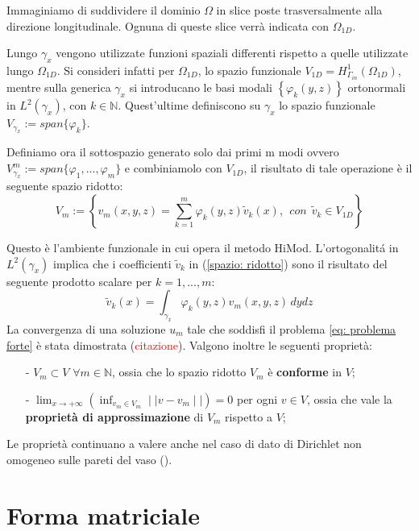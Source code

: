 Immaginiamo di suddividere il dominio $\Omega$ in slice poste trasversalmente alla direzione longitudinale. Ognuna di queste slice verr\`a indicata con $\Omega_{1D}$.

Lungo $\gamma_x$ vengono utilizzate funzioni spaziali differenti rispetto a quelle utilizzate lungo $\Omega_{1D}$. Si consideri infatti per $\Omega_{1D}$, lo spazio funzionale $V_{1D}=H^1_{\Gamma_{in}}(\Omega_{1D})$, mentre sulla generica $\gamma_x$ si introducano le basi modali $\left\{ \varphi_k(y,z) \right\}$ ortonormali in $L^2(\gamma_x)$, con $k \in \mathbb{N}$.
Quest'ultime definiscono su $\gamma_x$ lo spazio funzionale $V_{\gamma_x}:=span\{\varphi_k\}$.

Definiamo ora il sottospazio generato solo dai primi m modi ovvero  $V^m_{\gamma_x}:=span\{\varphi_1,...,\varphi_m\}$ e combiniamolo con $V_{1D}$, il risultato di tale operazione \`e il seguente spazio ridotto:
\begin{equation}
\label{spazio: ridotto}
V_m:=\left\{v_m(x,y,z)=\sum^m_{k=1}\varphi_k(y,z)\tilde{v}_k(x) ,\:\:con\:\:\tilde{v}_k\in V_{1D}\right\}
\end{equation}

Questo \`e l'ambiente funzionale in cui opera il metodo HiMod.
L'ortogonalit\'a in $L^2(\gamma_x)$ implica che i coefficienti  $\tilde{v}_k$ in (\ref{spazio: ridotto}) sono il risultato del seguente prodotto scalare per $k=1,...,m$:
\begin{displaymath}
\tilde{v}_k(x)=\int_{\gamma_x}\varphi_k(y,z)v_m(x,y,z)\,dydz
\end{displaymath}
La convergenza di una soluzione $u_m$ tale che soddisfi il problema \eqref{eq: problema forte} \`e stata dimostrata (\textcolor{red}{citazione}). Valgono inoltre le seguenti propriet\`a:
\begin{itemize}
\item[-] $V_m \subset V$ $\forall m\in \mathbb{N}$, ossia che lo spazio ridotto $V_m$ \`e \textbf{conforme} in $V$;
\item[-] $\displaystyle \lim_{x\to +\infty} \left(\inf_{v_m\in V_m}\mid\mid v-v_m\mid\mid\right)=0$ 
per ogni $v \in V$, ossia che vale la \textbf{propriet\`a di approssimazione} di $V_m$ rispetto a $V$;
\end{itemize}
Le propriet\`a continuano a valere anche nel caso di dato di Dirichlet non omogeneo sulle pareti del vaso (\cite{perotto:2009}).

\section{Forma matriciale}

